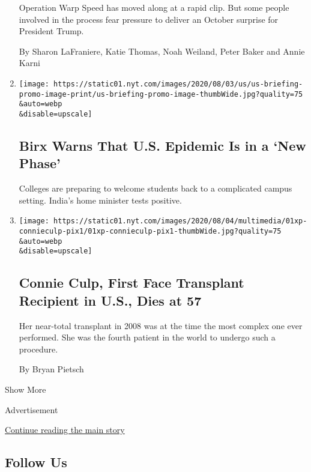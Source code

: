 \begin{enumerate}
  Operation Warp Speed has moved along at a rapid clip. But some people
  involved in the process fear pressure to deliver an October surprise
  for President Trump.

  By Sharon LaFraniere, Katie Thomas, Noah Weiland, Peter Baker and
  Annie Karni
\item
  \href{/2020/08/02/world/coronavirus-covid-19.html}{}

  \texttt{[image: https://static01.nyt.com/images/2020/08/03/us/us-briefing-promo-image-print/us-briefing-promo-image-thumbWide.jpg?quality=75\\\&auto=webp\\\&disable=upscale]}

  \hypertarget{birx-warns-that-us-epidemic-is-in-a-new-phase}{%
  \subsection{Birx Warns That U.S. Epidemic Is in a `New
  Phase'}\label{birx-warns-that-us-epidemic-is-in-a-new-phase}}

  Colleges are preparing to welcome students back to a complicated
  campus setting. India's home minister tests positive.
\item
  \href{/2020/08/01/us/Connie-culp-dead-face-transplant.html}{}

  \texttt{[image: https://static01.nyt.com/images/2020/08/04/multimedia/01xp-connieculp-pix1/01xp-connieculp-pix1-thumbWide.jpg?quality=75\\\&auto=webp\\\&disable=upscale]}

  \hypertarget{connie-culp-first-face-transplant-recipient-in-us-dies-at-57}{%
  \subsection{Connie Culp, First Face Transplant Recipient in U.S., Dies
  at
  57}\label{connie-culp-first-face-transplant-recipient-in-us-dies-at-57}}

  Her near-total transplant in 2008 was at the time the most complex one
  ever performed. She was the fourth patient in the world to undergo
  such a procedure.

  By Bryan Pietsch
\end{enumerate}

Show More

Advertisement

\protect\hyperlink{after-mid3}{Continue reading the main story}

\hypertarget{follow-us}{%
\subsection{Follow Us}\label{follow-us}}

